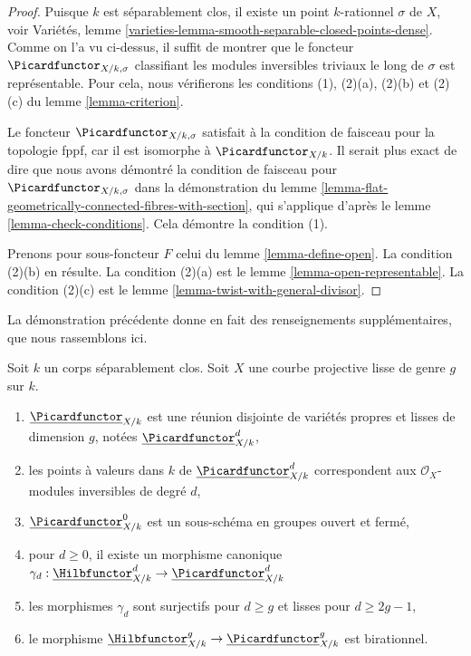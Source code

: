 \begin{proof}
Puisque $k$ est séparablement clos, il existe un point $k$-rationnel $\sigma$
de $X$, voir
Variétés, lemme \ref{varieties-lemma-smooth-separable-closed-points-dense}.
Comme on l'a vu ci-dessus, il suffit de montrer que le foncteur
$\Picardfunctor_{X/k, \sigma}$ classifiant les modules inversibles triviaux le long de
$\sigma$ est représentable. Pour cela, nous vérifierons les conditions (1),
(2)(a), (2)(b) et (2)(c) du
lemme \ref{lemma-criterion}.

\medskip\noindent
Le foncteur $\Picardfunctor_{X/k, \sigma}$ satisfait à la condition de faisceau
pour la topologie fppf, car il est isomorphe à $\Picardfunctor_{X/k}$.
Il serait plus exact de dire que nous avons démontré la condition de faisceau
pour $\Picardfunctor_{X/k, \sigma}$ dans la démonstration du
lemme \ref{lemma-flat-geometrically-connected-fibres-with-section},
qui s'applique d'après le lemme \ref{lemma-check-conditions}.
Cela démontre la condition (1).

\medskip\noindent
Prenons pour sous-foncteur $F$ celui du lemme \ref{lemma-define-open}.
La condition (2)(b) en résulte.
La condition (2)(a) est le lemme \ref{lemma-open-representable}.
La condition (2)(c) est le lemme \ref{lemma-twist-with-general-divisor}.
\end{proof}

\noindent
La démonstration précédente donne en fait des renseignements supplémentaires, que nous
rassemblons ici.

\begin{lemma}
\label{lemma-picard-pieces}
Soit $k$ un corps séparablement clos. Soit $X$ une courbe projective lisse
de genre $g$ sur $k$.
\begin{enumerate}
\item $\underline{\Picardfunctor}_{X/k}$ est une réunion disjointe de variétés
propres et lisses de dimension $g$, notées $\underline{\Picardfunctor}^d_{X/k}$,
\item les points à valeurs dans $k$ de $\underline{\Picardfunctor}^d_{X/k}$
correspondent aux $\mathcal{O}_X$-modules inversibles de degré $d$,
\item $\underline{\Picardfunctor}^0_{X/k}$
est un sous-schéma en groupes ouvert et fermé,
\item pour $d \geq 0$, il existe un morphisme canonique
$\gamma_d :
\underline{\Hilbfunctor}^d_{X/k} \to \underline{\Picardfunctor}^d_{X/k}$
\item les morphismes $\gamma_d$
sont surjectifs pour $d \geq g$ et lisses pour $d \geq 2g - 1$,
\item le morphisme
$\underline{\Hilbfunctor}^g_{X/k} \to \underline{\Picardfunctor}^g_{X/k}$
est birationnel.
\end{enumerate}
\end{lemma}

